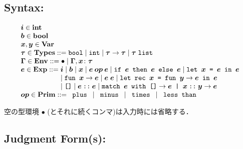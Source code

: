 \documentclass[11pt]{jarticle}
\begin{document}


\subsection*{Syntax:}

\[\begin{array}{l}
\TypingMLivMV{i}[] \in \mathbf{int}\\
\TypingMLivMV{b}[] \in \mathbf{bool}\\
\TypingMLivMV{x}[], \TypingMLivMV{y}[] \in \mathbf{Var}\\
\TypingMLivMV{t}[] \in \mathbf{Types} ::= \TypingMLivTyBoolTerm
\mid \TypingMLivTyIntTerm \mid \TypingMLivTyFunTerm{\TypingMLivMV{t}[]}
{\TypingMLivMV{t}[]}
\mid \TypingMLivTyListTerm{\TypingMLivMV{t}[]}\\
\TypingMLivMV{env}[] \in \mathbf{Env} ::= \TypingMLivEmptyTerm
\mid \TypingMLivBindTerm{\TypingMLivMV{env}[]}{\TypingMLivMV{x}[]}
{\TypingMLivMV{t}[]}\\
\TypingMLivMV{e}[] \in \mathbf{Exp} ::= \TypingMLivMV{i}[]
\mid \TypingMLivMV{b}[] \mid \TypingMLivMV{x}[]
\mid \TypingMLivBinOpTerm{\TypingMLivMV{op}[]}{\TypingMLivMV{e}[]}
{\TypingMLivMV{e}[]} \mid \TypingMLivIfTerm{\TypingMLivMV{e}[]}
{\TypingMLivMV{e}[]}{\TypingMLivMV{e}[]}
\mid \TypingMLivLetTerm{\TypingMLivMV{x}[]}{\TypingMLivMV{e}[]}
{\TypingMLivMV{e}[]}  \\ \hspace*{2.0cm}
\mid \TypingMLivAbsTerm{\TypingMLivMV{x}[]}
{\TypingMLivMV{e}[]} \mid \TypingMLivAppTerm{\TypingMLivMV{e}[]}
{\TypingMLivMV{e}[]} \mid \TypingMLivLetRecTerm{\TypingMLivMV{x}[]}
{\TypingMLivMV{y}[]}{\TypingMLivMV{e}[]}{\TypingMLivMV{e}[]}
 \\ \hspace*{2.0cm}
\mid \TypingMLivNilTerm \mid \TypingMLivConsTerm{\TypingMLivMV{e}[]}
{\TypingMLivMV{e}[]} \mid \TypingMLivMatchTerm{\TypingMLivMV{e}[]}
{\TypingMLivMV{e}[]}{\TypingMLivMV{x}[]}{\TypingMLivMV{y}[]}
{\TypingMLivMV{e}[]}\\
\TypingMLivMV{op}[] \in \mathbf{Prim} ::= \TypingMLivPlusTerm
\mid \TypingMLivMinusTerm \mid \TypingMLivMultTerm
\mid \TypingMLivLtTerm\\
\end{array}\]

空の型環境 \(\bullet\) (とそれに続くコンマ)は入力時には省略する．

\subsection*{Judgment Form(s):}
\end{document}
